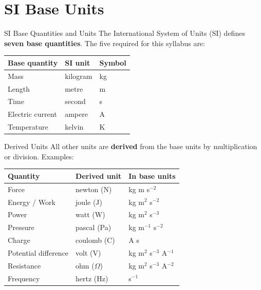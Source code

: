 \pagebreak

\section{SI Base Units}

\begin{definitionbox}{SI Base Quantities and Units}
The International System of Units (SI) defines \textbf{seven base quantities}. The five required for this syllabus are:

\begin{center}
\renewcommand{\arraystretch}{1.5}
\begin{tabular}{@{} l l l @{}}
\toprule
\textbf{Base quantity} & \textbf{SI unit} & \textbf{Symbol} \\
\midrule
Mass & kilogram & kg \\
Length & metre & m \\
Time & second & s \\
Electric current & ampere & A \\
Temperature & kelvin & K \\
\bottomrule
\end{tabular}
\end{center}
\end{definitionbox}

\begin{definitionbox}{Derived Units}
All other units are \textbf{derived} from the base units by multiplication or division. Examples:

\begin{center}
\renewcommand{\arraystretch}{1.5}
\begin{tabular}{@{} l l l @{}}
\toprule
\textbf{Quantity} & \textbf{Derived unit} & \textbf{In base units} \\
\midrule
Force & newton (N) & kg m s$^{-2}$ \\
Energy / Work & joule (J) & kg m$^2$ s$^{-2}$ \\
Power & watt (W) & kg m$^2$ s$^{-3}$ \\
Pressure & pascal (Pa) & kg m$^{-1}$ s$^{-2}$ \\
Charge & coulomb (C) & A s \\
Potential difference & volt (V) & kg m$^2$ s$^{-3}$ A$^{-1}$ \\
Resistance & ohm ($\Omega$) & kg m$^2$ s$^{-3}$ A$^{-2}$ \\
Frequency & hertz (Hz) & s$^{-1}$ \\
\bottomrule
\end{tabular}
\end{center}
\end{definitionbox}

